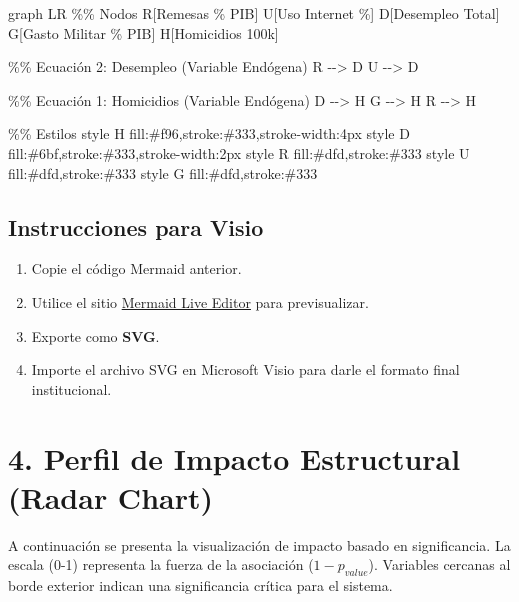 \documentclass[12pt,spanish]{article}
\newenvironment{Shaded}{\begin{snugshade}}{\end{snugshade}}
\newenvironment{Highlighting}{}{}
\newcommand{\NormalTok}[1]{#1}
\providecommand{\tightlist}{%
  \setlength{\itemsep}{0pt}\setlength{\parskip}{0pt}}
\begin{document}
\begin{Shaded}
\begin{Highlighting}[]
\NormalTok{graph LR}
\NormalTok{    \%\% Nodos}
\NormalTok{    R[Remesas \% PIB]}
\NormalTok{    U[Uso Internet \%]}
\NormalTok{    D[Desempleo Total]}
\NormalTok{    G[Gasto Militar \% PIB]}
\NormalTok{    H[Homicidios 100k]}

\NormalTok{    \%\% Ecuación 2: Desempleo (Variable Endógena)}
\NormalTok{    R {-}{-}\textgreater{} D}
\NormalTok{    U {-}{-}\textgreater{} D}

\NormalTok{    \%\% Ecuación 1: Homicidios (Variable Endógena)}
\NormalTok{    D {-}{-}\textgreater{} H}
\NormalTok{    G {-}{-}\textgreater{} H}
\NormalTok{    R {-}{-}\textgreater{} H}

\NormalTok{    \%\% Estilos}
\NormalTok{    style H fill:\#f96,stroke:\#333,stroke{-}width:4px}
\NormalTok{    style D fill:\#6bf,stroke:\#333,stroke{-}width:2px}
\NormalTok{    style R fill:\#dfd,stroke:\#333}
\NormalTok{    style U fill:\#dfd,stroke:\#333}
\NormalTok{    style G fill:\#dfd,stroke:\#333}
\end{Highlighting}
\end{Shaded}

\subsection{Instrucciones para Visio}\label{instrucciones-para-visio}

\begin{enumerate}
\def\labelenumi{\arabic{enumi}.}
\tightlist
\item
  Copie el código Mermaid anterior.
\item
  Utilice el sitio \href{https://mermaid.live/}{Mermaid Live Editor}
  para previsualizar.
\item
  Exporte como \textbf{SVG}.
\item
  Importe el archivo SVG en Microsoft Visio para darle el formato final
  institucional.
\end{enumerate}

\section{4. Perfil de Impacto Estructural (Radar
Chart)}\label{perfil-de-impacto-estructural-radar-chart}

A continuación se presenta la visualización de impacto basado en
significancia. La escala (0-1) representa la fuerza de la asociación
(\(1 - p_{value}\)). Variables cercanas al borde exterior indican una
significancia crítica para el sistema.
\end{document}
